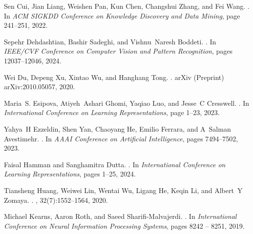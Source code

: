 \documentclass{article}
\begin{document}
\begin{thebibliography}{}
Sen Cui, Jian Liang, Weishen Pan, Kun Chen, Changshui Zhang, and Fei Wang.
.
\newblock In {\em {ACM SIGKDD Conference on Knowledge Discovery and Data Mining}}, page 241–251, 2022.

Sepehr Dehdashtian, Bashir Sadeghi, and Vishnu~Naresh Boddeti.
.
\newblock In {\em {IEEE/CVF Conference on Computer Vision and Pattern Recognition}}, pages 12037--12046, 2024.

Wei Du, Depeng Xu, Xintao Wu, and Hanghang Tong.
.
\newblock arXiv (Preprint) arXiv:2010.05057, 2020.

Maria~S. Esipova, Atiyeh~Ashari Ghomi, Yaqiao Luo, and Jesse~C Cresswell.
.
\newblock In {\em {International Conference on Learning Representations}}, page 1–23, 2023.

Yahya~H Ezzeldin, Shen Yan, Chaoyang He, Emilio Ferrara, and A~Salman Avestimehr.
.
\newblock In {\em {AAAI Conference on Artificial Intelligence}}, pages 7494--7502, 2023.

Faisal Hamman and Sanghamitra Dutta.
.
\newblock In {\em {International Conference on Learning Representations}}, pages 1--25, 2024.

Tiansheng Huang, Weiwei Lin, Wentai Wu, Ligang He, Keqin Li, and Albert~Y Zomaya.
.
, 32(7):1552--1564, 2020.

Michael Kearns, Aaron Roth, and Saeed Sharifi-Malvajerdi.
.
\newblock In {\em {International Conference on Neural Information Processing Systems}}, pages 8242 -- 8251, 2019.


\end{thebibliography}
\end{document}

